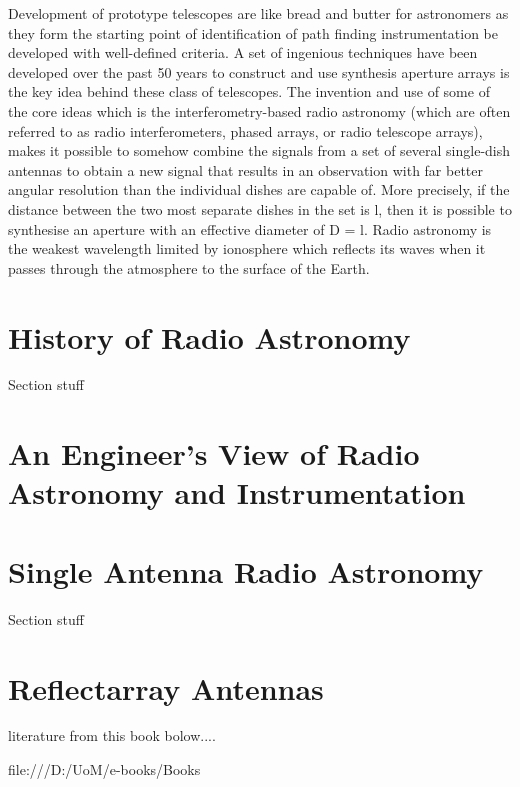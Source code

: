 {Development of prototype telescopes  are like bread and butter for astronomers as they form the starting point of identification of path finding instrumentation be developed with well-defined criteria. A set of ingenious techniques have been developed over the past 50 years to construct and use synthesis aperture arrays \cite{mcmahon2011adventures}
is the key idea behind these class of telescopes.
The invention and use of some of the core ideas which is the interferometry-based radio astronomy (which are often referred to as radio interferometers, phased arrays, or radio telescope arrays), makes it possible to somehow combine the signals from a set of several single-dish antennas to obtain a new signal that results in an observation with far better angular resolution than the individual dishes are capable of. More precisely, if the distance between the two most separate dishes in the set is l, then it is possible to synthesise an aperture with an effective diameter of D = l.
 Radio astronomy is the weakest wavelength limited by ionosphere which reflects its waves when it passes through the atmosphere to the surface of the Earth.









\section{History of Radio Astronomy }

Section stuff

\section{ An Engineer’s View of Radio Astronomy and Instrumentation}
\section{Single Antenna Radio Astronomy}
Section stuff

\section{Reflectarray Antennas
}


literature from this book bolow....

file:///D:/UoM/e-books/Books%


}

